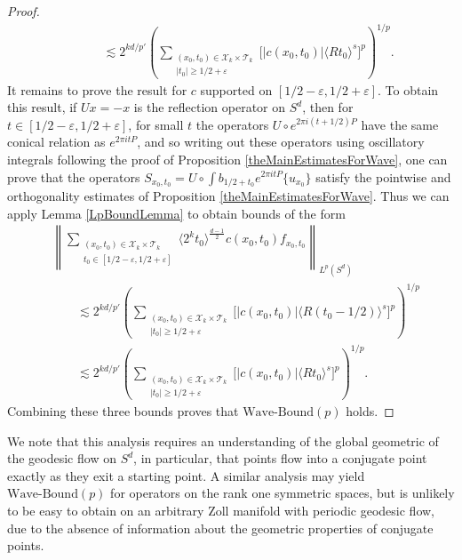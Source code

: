 \begin{proof}
\begin{equation}
\begin{split}
        &\quad\quad \lesssim 2^{kd/p'} \left( \sum\nolimits_{\substack{(x_0,t_0) \in \mathcal{X}_k \times \mathcal{T}_k\\|t_0| \geq 1/2 + \varepsilon}} \Big[ |c(x_0,t_0)| \langle R t_0 \rangle^{s} \Big]^p \right)^{1/p}.
    \end{split}
    \end{equation}
    It remains to prove the result for $c$ supported on $[1/2 - \varepsilon, 1/2 + \varepsilon]$. To obtain this result, if $Ux = -x$ is the reflection operator on $S^d$, then for $t \in [1/2 - \varepsilon, 1/2 + \varepsilon]$, for small $t$ the operators $U \circ e^{2 \pi i (t + 1/2) P}$ have the same conical relation as $e^{2 \pi i t P}$, and so writing out these operators using oscillatory integrals following the proof of Proposition \ref{theMainEstimatesForWave}, one can prove that the operators $S\!_{x_0,t_0} = U \circ \int b_{1/2 + t_0} e^{2 \pi i t P} \{ u_{x_0} \}$ satisfy the pointwise and orthogonality estimates of Proposition \ref{theMainEstimatesForWave}. Thus we can apply Lemma \ref{LpBoundLemma} to obtain bounds of the form
    \begin{equation}
    \begin{split}
        &\left\| \sum\nolimits_{\substack{(x_0,t_0) \in \mathcal{X}_k \times \mathcal{T}_k\\t_0 \in [1/2 - \varepsilon, 1/2 + \varepsilon]}} \langle 2^k t_0 \rangle^{\frac{d-1}{2}} c(x_0,t_0) f_{x_0,t_0} \right\|_{L^p(S^d)} \\
        &\quad\quad \lesssim 2^{kd/p'} \left( \sum\nolimits_{\substack{(x_0,t_0) \in \mathcal{X}_k \times \mathcal{T}_k\\|t_0| \geq 1/2 + \varepsilon}} \Big[ |c(x_0,t_0)| \langle R (t_0 - 1/2) \rangle^{s} \Big]^p \right)^{1/p}\\
        &\quad\quad \lesssim 2^{kd/p'} \left( \sum\nolimits_{\substack{(x_0,t_0) \in \mathcal{X}_k \times \mathcal{T}_k\\|t_0| \geq 1/2 + \varepsilon}} \Big[ |c(x_0,t_0)| \langle R t_0 \rangle^{s} \Big]^p \right)^{1/p}.
    \end{split}
    \end{equation}
    Combining these three bounds proves that $\text{Wave-Bound}(p)$ holds.
\end{proof}

\begin{remark}
    We note that this analysis requires an understanding of the global geometric of the geodesic flow on $S^d$, in particular, that points flow into a conjugate point exactly as they exit a starting point. A similar analysis may yield $\text{Wave-Bound}(p)$ for operators on the rank one symmetric spaces, but is unlikely to be easy to obtain on an arbitrary Zoll manifold with periodic geodesic flow, due to the absence of information about the geometric properties of conjugate points.
\end{remark}